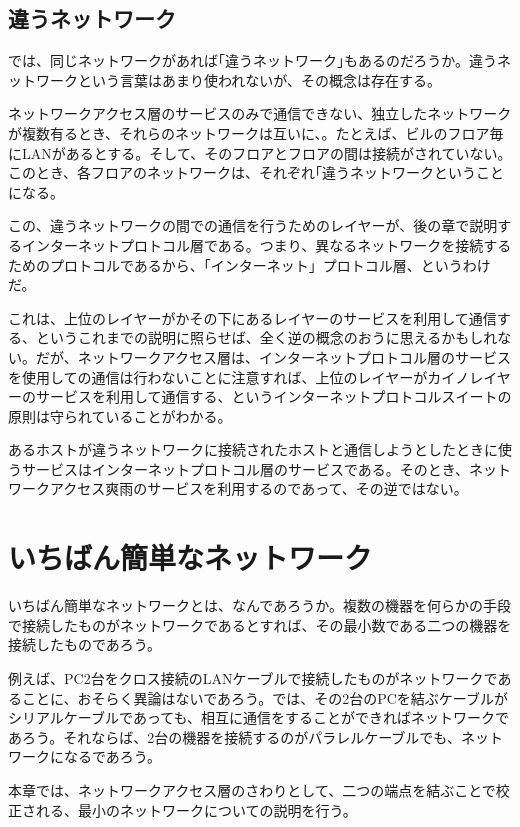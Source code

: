\subsection{違うネットワーク}

では、同じネットワークがあれば｢違うネットワーク｣もあるのだろうか。違うネットワークという言葉はあまり使われないが、その概念は存在する。

ネットワークアクセス層のサービスのみで通信できない、独立したネットワークが複数有るとき、それらのネットワークは互いに、。たとえば、ビルのフロア毎にLANがあるとする。そして、そのフロアとフロアの間は接続がされていない。このとき、各フロアのネットワークは、それぞれ｢違うネットワークということになる。

この、違うネットワークの間での通信を行うためのレイヤーが、後の章で説明するインターネットプロトコル層である。つまり、異なるネットワークを接続するためのプロトコルであるから、「インターネット」プロトコル層、というわけだ。

これは、上位のレイヤーがかその下にあるレイヤーのサービスを利用して通信する、というこれまでの説明に照らせば、全く逆の概念のおうに思えるかもしれない。だが、ネットワークアクセス層は、インターネットプロトコル層のサービスを使用しての通信は行わないことに注意すれば、上位のレイヤーがカイノレイヤーのサービスを利用して通信する、というインターネットプロトコルスイートの原則は守られていることがわかる。

あるホストが違うネットワークに接続されたホストと通信しようとしたときに使うサービスはインターネットプロトコル層のサービスである。そのとき、ネットワークアクセス爽雨のサービスを利用するのであって、その逆ではない。

\section{いちばん簡単なネットワーク}

いちばん簡単なネットワークとは、なんであろうか。複数の機器を何らかの手段で接続したものがネットワークであるとすれば、その最小数である二つの機器を接続したものであろう。

例えば、PC2台をクロス接続のLANケーブルで接続したものがネットワークであることに、おそらく異論はないであろう。では、その2台のPCを結ぶケーブルがシリアルケーブルであっても、相互に通信をすることができればネットワークであろう。それならば、2台の機器を接続するのがパラレルケーブルでも、ネットワークになるであろう。

本章では、ネットワークアクセス層のさわりとして、二つの端点を結ぶことで校正される、最小のネットワークについての説明を行う。



